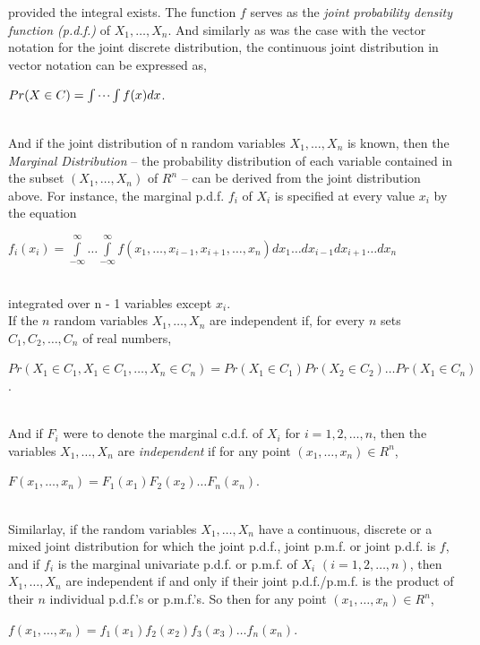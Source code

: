 \documentclass[12pt,twoside]{reedthesis}
\begin{document}
\begin{enumerate}
\begin{enumerate}
provided the integral exists. The function $f$ serves as the \textit{joint probability density function (p.d.f.)} of $X_1, \dotsc, X_n$. And similarly as was the case with the vector notation for the joint discrete distribution, the continuous joint distribution in vector notation can be expressed as,

\begin{center}     
$Pr(X \in C) = \idotsint f(x)dx$.
\end{center}\\

And if the joint distribution of n random variables $X_1, \dotsc, X_n$ is known, then the \textit{Marginal  Distribution} – the probability distribution of each variable contained in the subset $(X_1, \dotsc, X_n)$ of $R^n$ – can be derived from the joint distribution above. For instance, the marginal p.d.f. $f_i$ of $X_i$ is specified at every value $x_i$ by the equation
\begin{center}
$f_i(x_i) = \int\limits_{-\infty}^{\infty} \dotsc	\int\limits_{-\infty}^{\infty} f(x_1, \dotsc, x_{i-1}, x_{i+1}, \dotsc, x_n) dx_1 … dx_{i-1} dx_{i+1} … dx_n$
\end{center}\\

integrated over n - 1 variables except $x_i$.\\ 

If the $n$ random variables $X_1, \dotsc, X_n$ are independent if, for every $n$ sets $C_1, C_2, \dotsc, C_n$ of real numbers, 
\begin{center} 
$Pr(X_1 \in C_1, X_1 \in C_1, …, X_n \in C_n) = Pr(X_1 \in C_1) Pr(X_2 \in C_2) \dots Pr(X_1 \in C_n)$.
\end{center}\\

And if $F_i$ were to denote the marginal c.d.f. of $X_i$  for $i = 1, 2, \dotsc, n$, then the variables $X_1, \dotsc, X_n$ are \textit{independent} if for any point $(x_1, \dotsc, x_n) \in R^n$, 
\begin{center}
$F(x_1, \dotsc, x_n) = F_1(x_1) F_2(x_2) \dots F_n(x_n)$. 
\end{center}\\

Similarlay, if the random variables $X_1, \dotsc, X_n$ have a continuous, discrete or a mixed joint distribution for which the joint p.d.f., joint p.m.f. or joint p.d.f. is $f$, and if $f_i$ is the marginal univariate p.d.f. or p.m.f. of $X_i$ $(i = 1, 2, …, n)$, then $X_1, \dotsc, X_n$ are independent if and only if their joint p.d.f./p.m.f. is the product of their $n$ individual p.d.f.’s or p.m.f.’s. So then for any point $(x_1, \dotsc, x_n) \in R^n$,
\begin{center}
$f(x_1, \dotsc, x_n) = f_1(x_1) f_2(x_2) f_3(x_3) \dots f_n(x_n)$. 
\end{center}\\


\end{enumerate}
\end{enumerate}
\end{document}

